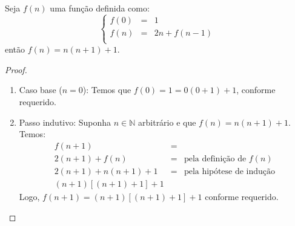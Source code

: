 \begin{Theorem}
Seja $f(n)$ uma função definida como:
\[
\left\{
\begin{array}{lcl}
  f(0) & = & 1 \\
  f(n) & = & 2n + f(n - 1)\\
\end{array}
\right .
\]
então $f(n) = n(n+1) + 1$.
\end{Theorem}
\begin{proof}
\verb| |\\
\begin{enumerate}
  \item[\ ]Caso base ($n = 0$): Temos que $f(0) = 1 = 0(0 +1) + 1$,
    conforme requerido.
  \item[\ ]Passo indutivo: Suponha $n\in\mathbb{N}$ arbitrário e que
    $f(n) = n(n+1) + 1$. Temos:
   \[
      \begin{array}{lcl}
      f(n+1) & = \\
      2 (n+1) + f(n) & = & \text{pela definição de }f(n)\\
      2(n+1) + n(n+1) + 1 & = & \text{pela hipótese de indução}\\
      (n+1)[(n+1) + 1] +1
      \end{array}
   \]
   Logo, $f(n+1) = (n+1)[(n+1) + 1] + 1$ conforme requerido.
\end{enumerate}
\end{proof}